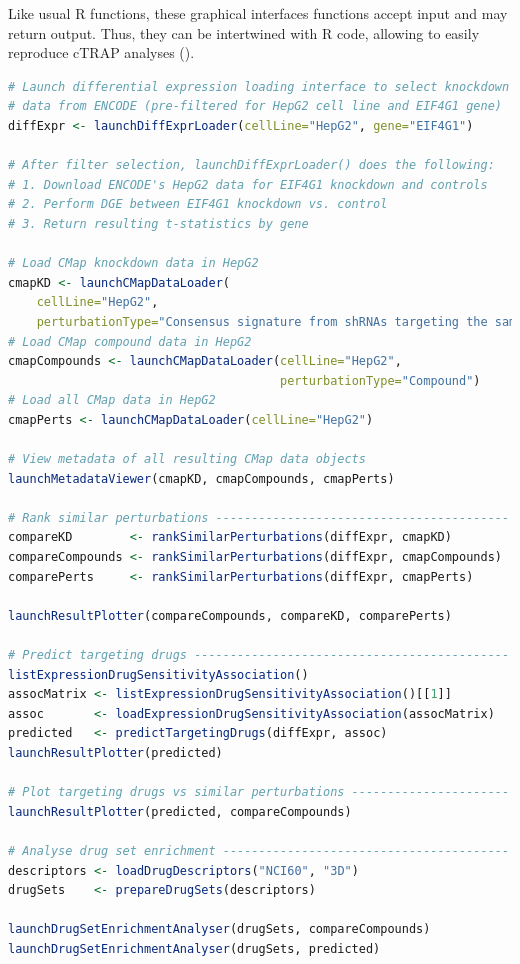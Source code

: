 Like usual R functions, these graphical interfaces functions accept input and may return output. Thus, they can be intertwined with R code, allowing to easily reproduce cTRAP analyses ().

\begin{lstlisting}[caption=Calling CTRAP's graphical interface functions in an R script.,label={lst:cTRAP-graphical},language=R,morekeywords={include, launchDiffExprLoader},keywordstyle=\bfseries]
# Launch differential expression loading interface to select knockdown
# data from ENCODE (pre-filtered for HepG2 cell line and EIF4G1 gene)
diffExpr <- launchDiffExprLoader(cellLine="HepG2", gene="EIF4G1")

# After filter selection, launchDiffExprLoader() does the following:
# 1. Download ENCODE's HepG2 data for EIF4G1 knockdown and controls
# 2. Perform DGE between EIF4G1 knockdown vs. control
# 3. Return resulting t-statistics by gene

# Load CMap knockdown data in HepG2
cmapKD <- launchCMapDataLoader(
    cellLine="HepG2",
    perturbationType="Consensus signature from shRNAs targeting the same gene")
# Load CMap compound data in HepG2
cmapCompounds <- launchCMapDataLoader(cellLine="HepG2",
                                      perturbationType="Compound")
# Load all CMap data in HepG2
cmapPerts <- launchCMapDataLoader(cellLine="HepG2")

# View metadata of all resulting CMap data objects
launchMetadataViewer(cmapKD, cmapCompounds, cmapPerts)

# Rank similar perturbations -----------------------------------------
compareKD        <- rankSimilarPerturbations(diffExpr, cmapKD)
compareCompounds <- rankSimilarPerturbations(diffExpr, cmapCompounds)
comparePerts     <- rankSimilarPerturbations(diffExpr, cmapPerts)

launchResultPlotter(compareCompounds, compareKD, comparePerts)

# Predict targeting drugs --------------------------------------------
listExpressionDrugSensitivityAssociation()
assocMatrix <- listExpressionDrugSensitivityAssociation()[[1]]
assoc       <- loadExpressionDrugSensitivityAssociation(assocMatrix)
predicted   <- predictTargetingDrugs(diffExpr, assoc)
launchResultPlotter(predicted)

# Plot targeting drugs vs similar perturbations ----------------------
launchResultPlotter(predicted, compareCompounds)

# Analyse drug set enrichment ----------------------------------------
descriptors <- loadDrugDescriptors("NCI60", "3D")
drugSets    <- prepareDrugSets(descriptors)

launchDrugSetEnrichmentAnalyser(drugSets, compareCompounds)
launchDrugSetEnrichmentAnalyser(drugSets, predicted)
\end{lstlisting}

